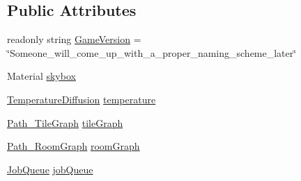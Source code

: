 \subsection*{Public Attributes}
\begin{DoxyCompactItemize}
\item 
readonly string \hyperlink{class_world_a48a644d09cb24d4bd6c79cf7d438dc44}{Game\+Version} = \char`\"{}Someone\+\_\+will\+\_\+come\+\_\+up\+\_\+with\+\_\+a\+\_\+proper\+\_\+naming\+\_\+scheme\+\_\+later\char`\"{}
\item 
Material \hyperlink{class_world_a12947be82424650dfae7fccc0a475f4c}{skybox}
\item 
\hyperlink{class_temperature_diffusion}{Temperature\+Diffusion} \hyperlink{class_world_afb73b4c36ddaf9eaf79807b0d3b0e012}{temperature}
\item 
\hyperlink{class_path___tile_graph}{Path\+\_\+\+Tile\+Graph} \hyperlink{class_world_a68088a0e3057902e6110cc52c0ca4c47}{tile\+Graph}
\item 
\hyperlink{class_path___room_graph}{Path\+\_\+\+Room\+Graph} \hyperlink{class_world_a561e1ac531ff776e3fe193312313c60d}{room\+Graph}
\item 
\hyperlink{class_job_queue}{Job\+Queue} \hyperlink{class_world_a975e9e8ae481b92ef188e0421dac5ae6}{job\+Queue}
\end{DoxyCompactItemize}
